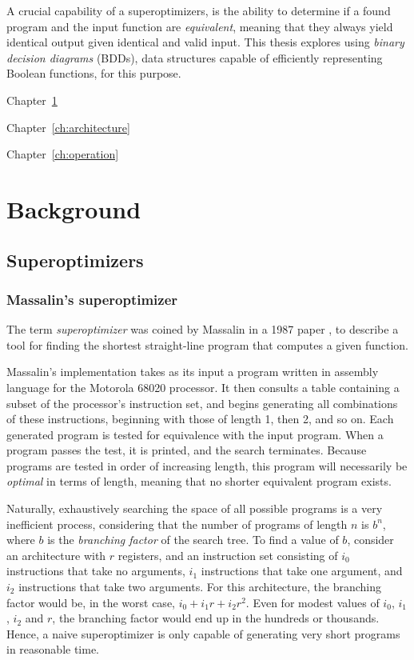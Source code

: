 \documentclass[a4paper,11pt]{kth-mag}
\begin{document}
A crucial capability of a superoptimizers, is the ability to determine if a found program and the input function are \emph{equivalent}, meaning that they always yield identical output given identical and valid input.
This thesis explores using \emph{binary decision diagrams} (BDDs), data structures capable of efficiently representing Boolean functions, for this purpose.


Chapter~\ref{ch:background}

Chapter~\ref{ch:architecture}

Chapter~\ref{ch:operation}

\chapter{Background}
\label{ch:background}

\section{Superoptimizers}

\subsection{Massalin's superoptimizer}

The term \emph{superoptimizer} was coined by Massalin in a 1987 paper \cite{massalin87}, to describe a tool for finding the shortest straight-line program that computes a given function.

Massalin's implementation takes as its input a program written in assembly language for the Motorola 68020 processor.
It then consults a table containing a subset of the processor's instruction set, and begins generating all combinations of these instructions, beginning with those of length 1, then 2, and so on.
Each generated program is tested for equivalence with the input program.
When a program passes the test, it is printed, and the search terminates.
Because programs are tested in order of increasing length, this program will necessarily be \emph{optimal} in terms of length, meaning that no shorter equivalent program exists.

Naturally, exhaustively searching the space of all possible programs is a very inefficient process, considering that the number of programs of length $n$ is $b^n$, where $b$ is the \emph{branching factor} of the search tree.
To find a value of $b$, consider an architecture with $r$ registers, and an instruction set consisting of $i_0$ instructions that take no arguments, $i_1$ instructions that take one argument, and $i_2$ instructions that take two arguments.
For this architecture, the branching factor would be, in the worst case, $i_0+i_1r+i_2r^2$.
Even for modest values of $i_0$, $i_1$, $i_2$ and $r$, the branching factor would end up in the hundreds or thousands.
Hence, a naive superoptimizer is only capable of generating very short programs in reasonable time.
\end{document}
